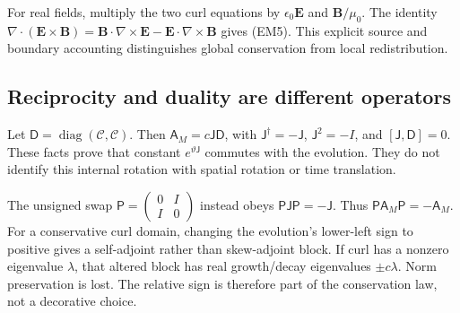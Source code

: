 For real fields, multiply the two curl equations by $\epsilon_0\mathbf E$ and $\mathbf B/\mu_0$. The identity $\nabla\cdot(\mathbf E\times\mathbf B)=\mathbf B\cdot\nabla\times\mathbf E-\mathbf E\cdot\nabla\times\mathbf B$ gives (EM5). This explicit source and boundary accounting distinguishes global conservation from local redistribution.

\subsection{Reciprocity and duality are different operators}
Let $\mathsf D=\operatorname{diag}(\mathscr C,\mathscr C)$. Then $\mathsf A_M=c\mathsf J\mathsf D$, with $\mathsf J^\dagger=-\mathsf J$, $\mathsf J^2=-I$, and $[\mathsf J,\mathsf D]=0$. These facts prove that constant $e^{\vartheta\mathsf J}$ commutes with the evolution. They do not identify this internal rotation with spatial rotation or time translation.

The unsigned swap $\mathsf P=\left(\begin{smallmatrix}0&I\\I&0\end{smallmatrix}\right)$ instead obeys $\mathsf P\mathsf J\mathsf P=-\mathsf J$. Thus $\mathsf P\mathsf A_M\mathsf P=-\mathsf A_M$. For a conservative curl domain, changing the evolution's lower-left sign to positive gives a self-adjoint rather than skew-adjoint block. If curl has a nonzero eigenvalue $\lambda$, that altered block has real growth/decay eigenvalues $\pm c\lambda$. Norm preservation is lost. The relative sign is therefore part of the conservation law, not a decorative choice.

